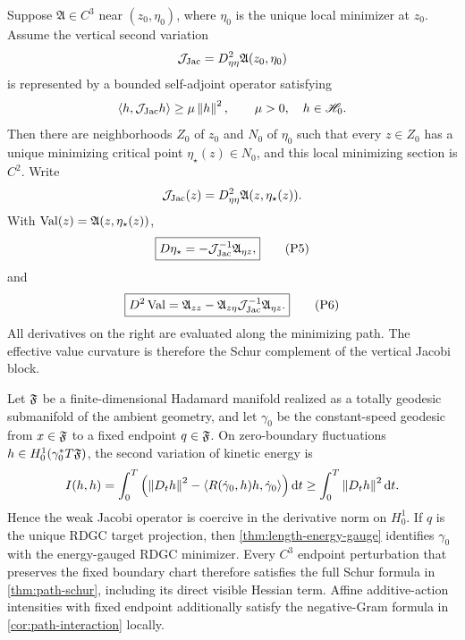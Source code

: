 \begin{theorem}
\label{thm:path-schur}
Suppose \(\mathfrak A\in C^3\) near \((z_0,\eta_0)\), where
\(\eta_0\) is the unique local minimizer at \(z_0\).  Assume the vertical
second variation
\[
  \mathcal J_{\mathrm{Jac}}
  =D^2_{\eta\eta}\mathfrak A(z_0,\eta_0)
\]
is represented by a bounded self-adjoint operator satisfying
\[
  \left\langle h,\mathcal J_{\mathrm{Jac}} h\right\rangle\ge\mu\left\lVert h\right\rVert^2,
  \qquad \mu>0,
  \quad h\in\mathscr H_0.
\]
Then there are neighborhoods \(Z_0\) of \(z_0\) and \(N_0\) of \(\eta_0\)
such that every \(z\in Z_0\) has a unique minimizing critical point
\(\eta_\star(z)\in N_0\), and this local minimizing section is \(C^2\).  Write
\[
  \mathcal J_{\mathrm{Jac}}(z)=D^2_{\eta\eta}\mathfrak A(z,\eta_\star(z)).
\]
With
\(\operatorname{Val}(z)=\mathfrak A(z,\eta_\star(z))\),
\begin{equation}
  \boxed{
  D\eta_\star
  =
  -\mathcal J_{\mathrm{Jac}}^{-1}\mathfrak A_{\eta z},}
  \tag{P5}
\end{equation}
and
\begin{equation}
  \boxed{
  D^2\operatorname{Val}
  =
  \mathfrak A_{zz}
  -\mathfrak A_{z\eta}\mathcal J_{\mathrm{Jac}}^{-1}\mathfrak A_{\eta z}.}
  \tag{P6}
\end{equation}
All derivatives on the right are evaluated along the minimizing path.  The
effective value curvature is therefore the Schur complement of the vertical
Jacobi block.
\end{theorem}

\begin{corollary}
\label{cor:rdgc-jacobi-bridge}
Let \(\mathfrak F\) be a finite-dimensional Hadamard manifold realized as a totally
geodesic submanifold of the ambient geometry, and let \(\gamma_0\) be the constant-speed geodesic from
\(x\in\mathfrak F\) to a fixed endpoint \(q\in\mathfrak F\).  On zero-boundary fluctuations
\(h\in H_0^1(\gamma_0^*T\mathfrak F)\), the second variation of kinetic energy is
\[
  I(h,h)=\int_0^T
  \left(\left\lVert D_th\right\rVert^2
  -\left\langle R(\dot\gamma_0,h)h,\dot\gamma_0\right\rangle\right)\mathrm d t
  \ge\int_0^T\left\lVert D_th\right\rVert^2\mathrm d t.
\]
Hence the weak Jacobi operator is coercive in the derivative norm on
\(H_0^1\).  If \(q\) is the unique RDGC target projection, then
\cref{thm:length-energy-gauge} identifies \(\gamma_0\) with the energy-gauged
RDGC minimizer.  Every \(C^3\) endpoint perturbation that preserves the fixed
boundary chart therefore satisfies the full Schur formula in
\cref{thm:path-schur}, including its direct visible Hessian term.  Affine
additive-action intensities with fixed endpoint additionally satisfy the
negative-Gram formula in \cref{cor:path-interaction} locally.
\end{corollary}

